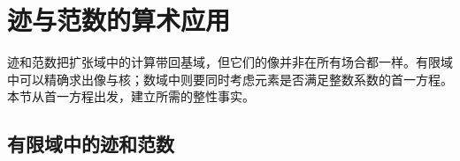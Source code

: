 
\section{迹与范数的算术应用}
\label{b1:sec:1804}

%
%
%

迹和范数把扩张域中的计算带回基域，但它们的像并非在所有场合都一样。有限域中可以精确求出像与核；数域中则要同时考虑元素是否满足整数系数的首一方程。本节从首一方程出发，建立所需的整性事实。

\subsection{有限域中的迹和范数}
\label{b1:subsec:1804:01}

